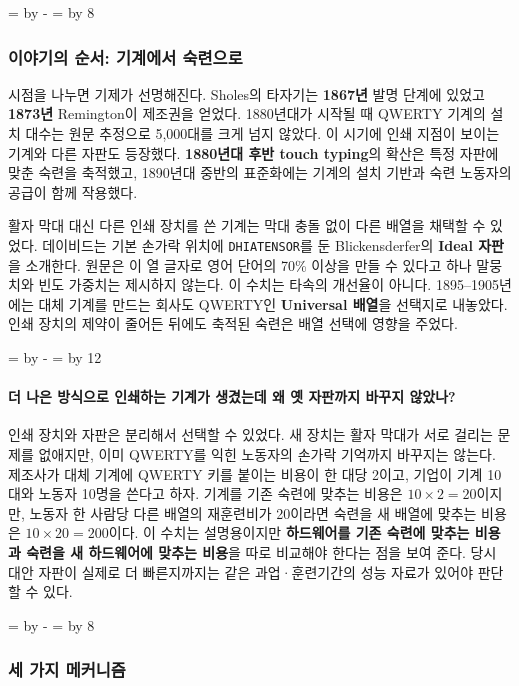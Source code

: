 \documentclass[10pt,a4paper]{article}
\newcommand{\ReserveQuestionSpace}{%
  \par\begingroup
  \dimen0=\pagegoal \advance\dimen0 by -\pagetotal
  \dimen2=\baselineskip \multiply\dimen2 by 12
  \ifdim\dimen0<\dimen2 \newpage\fi
  \endgroup}
\newcommand{\ReserveReadingSectionSpace}{%
  \par\begingroup
  \dimen0=\pagegoal \advance\dimen0 by -\pagetotal
  \dimen2=\baselineskip \multiply\dimen2 by 8
  \ifdim\dimen0<\dimen2 \newpage\fi
  \endgroup}
\begin{document}
\ReserveReadingSectionSpace
\subsubsection*{이야기의 순서: 기계에서 숙련으로}

시점을 나누면 기제가 선명해진다. Sholes의 타자기는 \textbf{1867년} 발명 단계에 있었고 \textbf{1873년} Remington이 제조권을 얻었다. 1880년대가 시작될 때 QWERTY 기계의 설치 대수는 원문 추정으로 5,000대를 크게 넘지 않았다. 이 시기에 인쇄 지점이 보이는 기계와 다른 자판도 등장했다. \textbf{1880년대 후반 touch typing}의 확산은 특정 자판에 맞춘 숙련을 축적했고, 1890년대 중반의 표준화에는 기계의 설치 기반과 숙련 노동자의 공급이 함께 작용했다.\par

활자 막대 대신 다른 인쇄 장치를 쓴 기계는 막대 충돌 없이 다른 배열을 채택할 수 있었다. 데이비드는 기본 손가락 위치에 \texttt{DHIATENSOR}를 둔 Blickensderfer의 \textbf{Ideal 자판}을 소개한다. 원문은 이 열 글자로 영어 단어의 70\% 이상을 만들 수 있다고 하나 말뭉치와 빈도 가중치는 제시하지 않는다. 이 수치는 타속의 개선율이 아니다. 1895–1905년에는 대체 기계를 만드는 회사도 QWERTY인 \textbf{Universal 배열}을 선택지로 내놓았다. 인쇄 장치의 제약이 줄어든 뒤에도 축적된 숙련은 배열 선택에 영향을 주었다.\par

\ReserveQuestionSpace
\paragraph{더 나은 방식으로 인쇄하는 기계가 생겼는데 왜 옛 자판까지 바꾸지 않았나?}
인쇄 장치와 자판은 분리해서 선택할 수 있었다. 새 장치는 활자 막대가 서로 걸리는 문제를 없애지만, 이미 QWERTY를 익힌 노동자의 손가락 기억까지 바꾸지는 않는다. 제조사가 대체 기계에 QWERTY 키를 붙이는 비용이 한 대당 2이고, 기업이 기계 10대와 노동자 10명을 쓴다고 하자. 기계를 기존 숙련에 맞추는 비용은 $10\times2=20$이지만, 노동자 한 사람당 다른 배열의 재훈련비가 20이라면 숙련을 새 배열에 맞추는 비용은 $10\times20=200$이다. 이 수치는 설명용이지만 \textbf{하드웨어를 기존 숙련에 맞추는 비용과 숙련을 새 하드웨어에 맞추는 비용}을 따로 비교해야 한다는 점을 보여 준다. 당시 대안 자판이 실제로 더 빠른지까지는 같은 과업·훈련기간의 성능 자료가 있어야 판단할 수 있다.\par

\ReserveReadingSectionSpace
\subsubsection*{세 가지 메커니즘}
\end{document}
